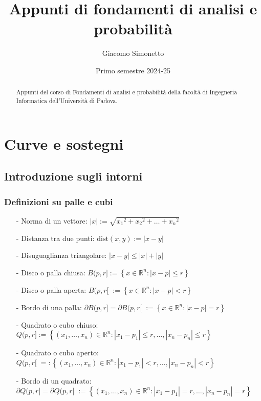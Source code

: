 \documentclass[a4paper]{article}
\title{Appunti di fondamenti di analisi e probabilità}
\author{Giacomo Simonetto}
\date{Primo semestre 2024-25}
\newcommand\dist{\text{dist}} %
\newcommand\Rn{\mathbb{R}^n}  %
\begin{document}
\maketitle
\begin{abstract}
	Appunti del corso di Fondamenti di analisi e probabilità della facoltà di Ingegneria Informatica dell'Università di Padova.
\end{abstract}

\newpage

\tableofcontents

\newpage

\section{Curve e sostegni}
\subsection{Introduzione sugli intorni}
\subsubsection*{Definizioni su palle e cubi}
\begin{itemize}[topsep=3pt, itemsep=0pt]
	\item[-] Norma di un vettore: \(\left| x \right| := \sqrt{{x_1}^2 + {x_2}^2 + \dots + {x_n}^2}\)
	\item[-] Distanza tra due punti: \(\dist(x,y) := \left| x-y \right|\)
	\item[-] Disuguaglianza triangolare: \(\left| x-y \right| \leq \left| x \right| + \left| y \right|\)
	\item[-] Disco o palla chiusa: \(B(p,r] := \left\{ x \in \Rn : \left| x-p \right| \leq r \right\}\)
	\item[-] Disco o palla aperta: \(B(p,r[ \; := \left\{ x \in \Rn : \left| x-p \right| < r \right\}\)
	\item[-] Bordo di una palla: \(\partial B(p,r] = \partial B(p,r[ \; := \left\{ x \in \Rn : \left| x-p \right| = r \right\}\)
	\item[-] Quadrato o cubo chiuso: \(Q(p,r] := \left\{ \left( x_1, \dots, x_n \right) \in \Rn : \left| x_1-p_1 \right| \leq r, \dots, \left| x_n-p_n \right| \leq r \right\}\)
	\item[-] Quadrato o cubo aperto: \(Q(p,r[ \; =: \left\{ \left( x_1, \dots, x_n \right) \in \Rn : \left| x_1-p_1 \right| < r, \dots, \left| x_n-p_n \right| < r \right\}\)
	\item[-] Bordo di un quadrato: \(\partial Q(p,r] = \partial Q(p,r[ \;:= \left\{ \left( x_1, \dots, x_n \right) \in \Rn : \left| x_1-p_1 \right| = r, \dots, \left| x_n-p_n \right| = r \right\}\)
\end{itemize}
\end{document}
